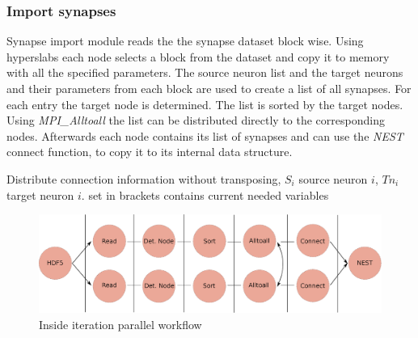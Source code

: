 \subsubsection{Import synapses}
Synapse import module reads the the synapse dataset block wise. Using hyperslabs each node selects a block from the
dataset and copy it to memory with all the specified parameters.
The source neuron list and the target neurons and their parameters from each block are used to create a list of all synapses.
For each entry the target node is determined.
The list is sorted by the target nodes.
Using \emph{MPI\_Alltoall} the list can be distributed directly to the corresponding nodes.
Afterwards each node contains its list of synapses and can use the \emph{NEST} connect function, to copy it to its internal data structure.
\begin{algorithm}
\label{alg2}
\caption{Distribute connection information without transposing, $S_i$ source neuron $i$, $Tn_i$ target neuron $i$.
	set in brackets contains current needed variables}
\end{algorithm}



\begin{figure}[ht!]
\centering
\includegraphics[scale=0.4]{pictures/Connect_inside_iteration.eps}
\caption{Inside iteration parallel workflow}
\end{figure}

